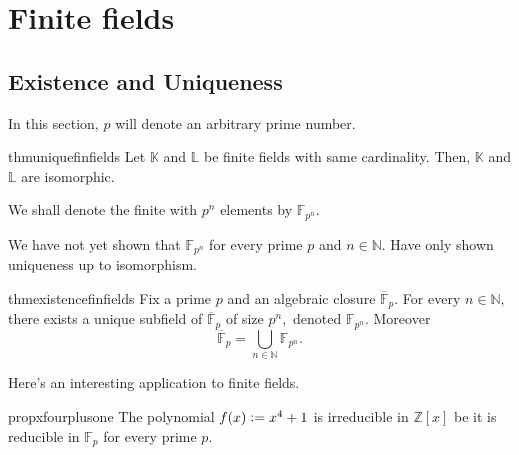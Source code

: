 \chapter{Finite fields}

\section{Existence and Uniqueness}

In this section, $p$ will denote an arbitrary prime number.

\begin{restatable}{thm}{uniquefinfields}
\label{thm:uniquefinfields}
    Let $\mathbb{K}$ and $\mathbb{L}$ be finite fields with same cardinality. Then, $\mathbb{K}$ and $\mathbb{L}$ are isomorphic. \hfill\hyperref[thm:uniquefinfields2]{\downsym}
\end{restatable}

\begin{defn}%
    We shall denote the finite with $p^n$ elements by $\mathbb{F}_{p^n}.$
\end{defn}

\begin{rem}
    We have not yet shown that $\mathbb{F}_{p^n}$ for every prime $p$ and $n \in \mathbb{N}.$ Have only shown uniqueness up to isomorphism.
\end{rem}

\begin{restatable}{thm}{existencefinfields}
\label{thm:existencefinfields}
    Fix a prime $p$ and an algebraic closure $\overline{\mathbb{F}}_p.$ For every $n \in \mathbb{N},$ there exists a unique subfield of $\overline{\mathbb{F}}_p$ of size $p^n,$ denoted $\mathbb{F}_{p^n}.$ Moreover
    \begin{equation*} 
        \overline{\mathbb{F}}_p = \bigcup_{n \in \mathbb{N}} \mathbb{F}_{p^n}.
    \end{equation*}
    \hfill\hyperref[thm:existencefinfields2]{\downsym}
\end{restatable}

Here's an interesting application to finite fields.

\begin{restatable}[]{prop}{xfourplusone}
\label{prop:xfourplusone}
    The polynomial $f(x) \vcentcolon= x^4 + 1$ is irreducible in $\mathbb{Z}[x]$ be it is reducible in $\mathbb{F}_p$ for every prime $p.$ \hfill\hyperref[prop:xfourplusone2]{\downsym}
\end{restatable}

